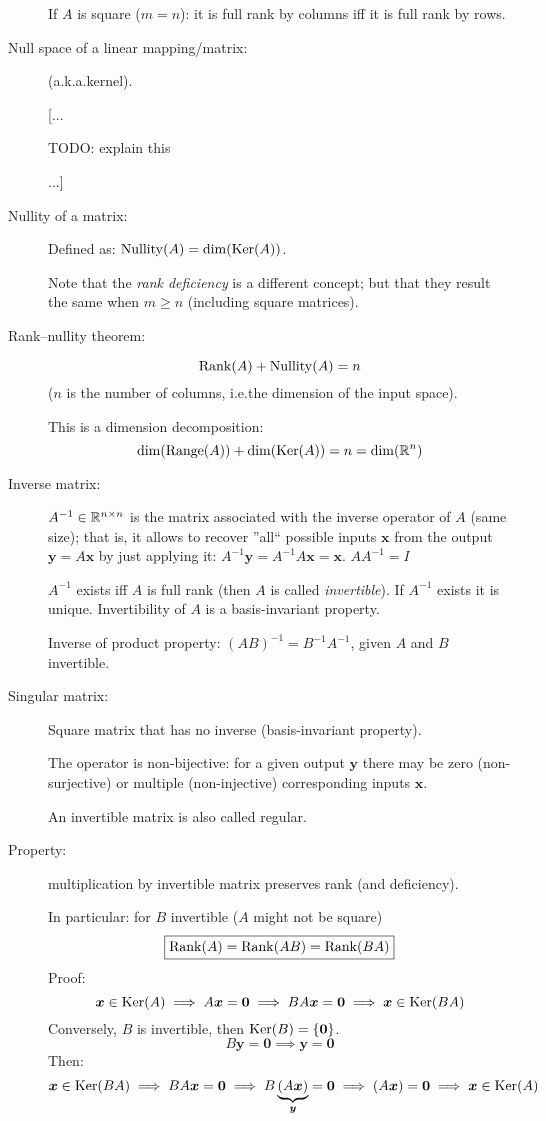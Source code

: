 \documentclass[
  12pt,
  paper=a4,
]{scrartcl} %
\begin{document}
\begin{description}
If $A$ is square ($m=n$): it is full rank by columns iff it is full rank by rows.

\item[Null space of a linear mapping/matrix:] (a.k.a.\@ kernel).

[...

\phantom{ }    TODO: explain this
    
...]

\item[Nullity of a matrix:]

Defined as: $\mathrm{Nullity}(A) = \dim(\operatorname{Ker}(A))$.

Note that the \emph{rank deficiency} is a different concept; but that they result the same when $m\ge n$ (including square matrices).


\item[Rank–nullity theorem:] 
\[
\operatorname{Rank}(A) + \mathrm{Nullity}(A)
= n
\]
($n$ is the number of columns, i.e.\@ the dimension of the input space).

This is a dimension decomposition:
\[
\dim(\operatorname{Range}(A)) + \dim(\operatorname{Ker}(A))
= n = \dim(\mathbb R^n)
\]


\item[Inverse matrix:] $A^{-1}\in\mathbb R^{n\times n}$ is the matrix associated with the inverse operator of $A$ (same size); that is, it allows to recover ''all`` possible inputs $\bm x$ from the output $\bm y=A\bm x$ by just applying it: $A^{-1}\bm y = A^{-1} A\bm x = \bm x$. $A A^{-1} = I$

$A^{-1}$ exists iff $A$ is full rank (then $A$ is called \emph{invertible}). If $A^{-1}$ exists it is unique. Invertibility of $A$ is a basis-invariant property.

Inverse of product property: $(AB)^{-1} = B^{-1}A^{-1}$, given $A$ and $B$ invertible.

\item[Singular matrix:] Square matrix that has no inverse (basis-invariant property).

The operator is non-bijective: for a given output $\bm y$ there may be zero (non-surjective) or multiple (non-injective) corresponding inputs $\bm x$.

An invertible matrix is also called regular.

\item[Property:] multiplication by invertible matrix preserves rank (and deficiency).

In particular: for $B$ invertible ($A$ might not be square)
\[\boxed{\operatorname{Rank}(A) = \operatorname{Rank}(AB) = \operatorname{Rank}(BA)}\]
Proof:
\[
\bm x\in \operatorname{Ker}(A) \implies A\bm x=\bm 0 \implies B A \bm x = \bm 0 \implies \bm x\in \operatorname{Ker}(BA)
\]
Conversely, $B$ is invertible, then $\operatorname{Ker}(B) = \{\bm 0\}$.
\[ B\bm y = \bm 0 \implies \bm y = \bm 0 \]
Then:
\[\bm x \in \operatorname{Ker}(BA) \implies BA\bm x = \bm 0 \implies B\underbrace{(A\bm x)}_{\bm y} = \bm 0 \implies (A\bm x) = \bm 0 \implies \bm x \in \operatorname{Ker}(A) \]


\end{description}
\end{document}

